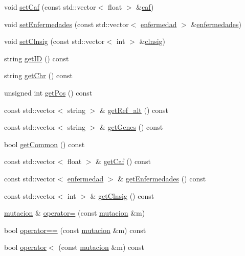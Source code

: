 \begin{DoxyCompactItemize}
\item 
void \hyperlink{classmutacion_a447b9009932a64b2ed6269ed2577f865}{set\+Caf} (const std\+::vector$<$ float $>$ \&\hyperlink{classmutacion_aef3fe46b6a2d10e3993703ebd5d5be5f}{caf})
\item 
void \hyperlink{classmutacion_a74da1d35cb0947b597ddf3b33e270d23}{set\+Enfermedades} (const std\+::vector$<$ \hyperlink{classenfermedad}{enfermedad} $>$ \&\hyperlink{classmutacion_ac8cca92dea1ab6fb9c193eed55a5ad28}{enfermedades})
\item 
void \hyperlink{classmutacion_aed8c1aedd3468bf27bafab931d576454}{set\+Clnsig} (const std\+::vector$<$ int $>$ \&\hyperlink{classmutacion_a0d029eee6925649df15081b780c12e37}{clnsig})
\item 
string \hyperlink{classmutacion_a6e3fa261f38b413aff9172fe065da8b8}{get\+ID} () const 
\item 
string \hyperlink{classmutacion_aefb0a9a6a8278f0d192ebc044198399c}{get\+Chr} () const 
\item 
unsigned int \hyperlink{classmutacion_ad08cb3c30da4195adc3c22d0b4c8edd7}{get\+Pos} () const 
\item 
const std\+::vector$<$ string $>$ \& \hyperlink{classmutacion_ad2e2452d29875aeed6dff7a98327135a}{get\+Ref\+\_\+alt} () const 
\item 
const std\+::vector$<$ string $>$ \& \hyperlink{classmutacion_a547be4b8d179d85cf46e7c311ce354c1}{get\+Genes} () const 
\item 
bool \hyperlink{classmutacion_abc353016535a561fbd8e902c83861228}{get\+Common} () const 
\item 
const std\+::vector$<$ float $>$ \& \hyperlink{classmutacion_a2d60aed548b4b151bc2c198e989faa20}{get\+Caf} () const 
\item 
const std\+::vector$<$ \hyperlink{classenfermedad}{enfermedad} $>$ \& \hyperlink{classmutacion_aec4992d4eab534b66fb572ff985d0b02}{get\+Enfermedades} () const 
\item 
const std\+::vector$<$ int $>$ \& \hyperlink{classmutacion_ad555ad20ff5cdb729fe7187e4547bc9f}{get\+Clnsig} () const 
\item 
\hyperlink{classmutacion}{mutacion} \& \hyperlink{classmutacion_a183a12f2fae6160c9f381bd48d719a23}{operator=} (const \hyperlink{classmutacion}{mutacion} \&m)
\item 
bool \hyperlink{classmutacion_a2e36c20aeff8c7cc88abe84efe0b11be}{operator==} (const \hyperlink{classmutacion}{mutacion} \&m) const 
\item 
bool \hyperlink{classmutacion_a0ccb4444b7afd120dc4557fd05f9ca27}{operator$<$} (const \hyperlink{classmutacion}{mutacion} \&m) const 
\end{DoxyCompactItemize}
